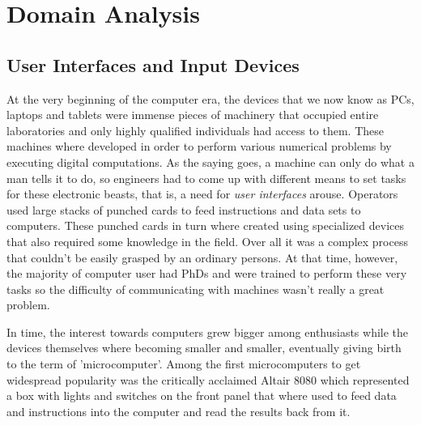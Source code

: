 \section{Domain Analysis}



\subsection{User Interfaces and Input Devices}


At the very beginning of the computer era, the devices that we now know as PCs, laptops and tablets were immense pieces of machinery that occupied entire laboratories and only highly qualified individuals had access to them. These machines where developed in order to perform various numerical problems by executing digital computations. As the saying goes, a machine can only do what a man tells it to do, so engineers had to come up with different means to set tasks for these electronic beasts, that is, a need for \emph{user interfaces} arouse. Operators used large stacks of punched cards to feed instructions and data sets to computers. These punched cards in turn where created using specialized devices that also required some knowledge in the field. Over all it was a complex process that couldn't be easily grasped by an ordinary persons. At that time, however, the majority of computer user had PhDs and were trained to perform these very tasks so the difficulty of communicating with machines wasn't really a great problem.


In time, the interest towards computers grew bigger among enthusiasts while the devices themselves where becoming smaller and smaller, eventually giving birth to the term of 'microcomputer'. Among the first microcomputers to get widespread popularity was the critically acclaimed Altair 8080 which represented a box with lights and switches on the front panel that where used to feed data and instructions into the computer and read the results back from it.

